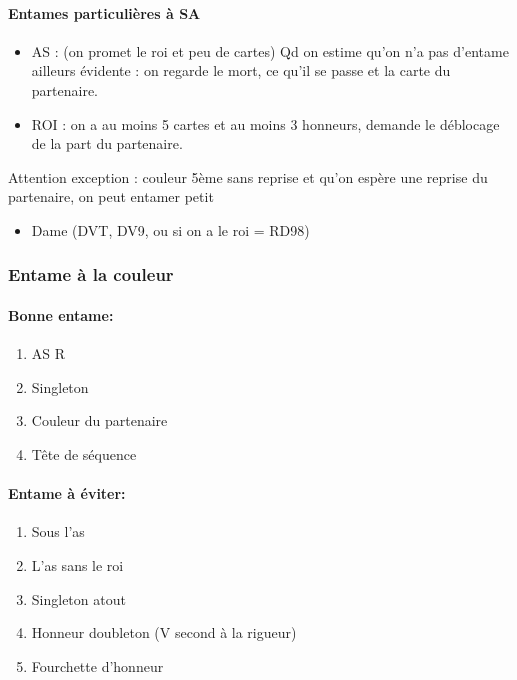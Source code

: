 \documentclass[a4paper]{article}
\begin{document}
\paragraph{Entames particulières à SA}

\begin{itemize}
\item AS : (on promet le roi et peu de cartes) Qd on estime qu’on n’a pas d’entame ailleurs évidente : on regarde le mort, ce qu’il se passe et la carte du partenaire.

\item ROI : on a au moins 5 cartes et au moins 3 honneurs, demande le déblocage de la part du partenaire.

\end{itemize}

Attention exception : couleur 5ème sans reprise et qu’on espère une reprise du partenaire, on peut entamer petit

\begin{itemize}
\item Dame (DVT, DV9, ou si on a le roi = RD98)

\end{itemize}

\subsubsection{Entame à la couleur}

\paragraph{Bonne entame:}

\begin{enumerate}
\item AS R

\item Singleton

\item Couleur du partenaire

\item Tête de séquence

\end{enumerate}

\paragraph{Entame à éviter:}

\begin{enumerate}
\item Sous l’as

\item L’as sans le roi

\item Singleton atout

\item Honneur doubleton (V second à la rigueur)

\item Fourchette d’honneur

\end{enumerate}
\end{document}
